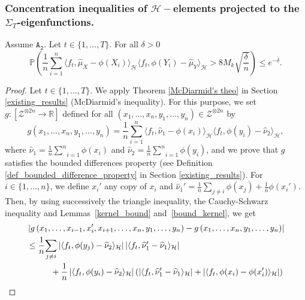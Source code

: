 \documentclass[twoside,11pt]{article}
\newcommand{\Hk}{\mathcal{H}}
\newcommand{\nb}{n}
\newcommand{\R}{\mathbb{R}}%
\newcommand{\PP}{\mathbb{P}}%
\newcommand{\A}[1]{$\mathtt{A_#1}$}
\begin{document}
\subsubsection*{Concentration inequalities of $\Hk-$elements projected to the $\Sigma_T$-eigenfunctions.}
\begin{lemma}
\label{covariance_term}
Assume \A{2}. Let $t \in \{1,\ldots,T\}$. For all $\delta >0$ 
\begin{equation*}
    \PP \left(  \frac{1}{\nb} \underset{i=1}{\overset{\nb}{\sum}} \langle f_t, \widehat{\mu}_X - \phi(X_i) \rangle_{\Hk} \langle f_t,\phi(Y_i) - \widehat{\mu}_Y  \rangle_{\Hk}> 8 M_k \sqrt{\frac \delta \nb} \right) \leq e^{- \delta}.
\end{equation*}
\end{lemma}
\begin{proof}
Let $t \in \{1,\ldots,T\}$. We apply Theorem \ref{McDiarmid's theo} in Section \ref{existing_results} (McDiarmid's inequality). For this purpose, we set $g : [\mathcal{Z}^{\otimes 2\nb} \longrightarrow \R]$ defined for all $ \left(x_1,\ldots,x_{\nb},y_1,\ldots,y_{\nb}\right) \in \mathcal{Z}^{\otimes 2\nb}$ by
$$g\left(x_1,\ldots,x_{\nb},y_1,\ldots,y_{\nb}\right) =  \frac{1}{\nb} \underset{i=1}{\overset{\nb}{\sum}} \langle f_t, \widehat{\nu}_1 - \phi(x_i) \rangle_{\Hk} \langle f_t,\phi(y_i) - \widehat{\nu}_2  \rangle_{\Hk},$$
where $\widehat{\nu}_1 = \frac{1}{\nb} \underset{i=1}{\overset{\nb}{\sum}} \phi(x_i)$ and $\widehat{\nu}_2 = \frac{1}{\nb} \underset{i=1}{\overset{\nb}{\sum}} \phi(y_i)$, and we prove that $g$ satisfies the bounded differences property (see Definition \ref{def_bounded_difference_property} in Section \ref{existing_results}). For $i \in \{1,\ldots,\nb\}$, we define $x_i'$ any copy of $x_i$ and $\widehat{\nu}_1' = \frac{1}{\nb}  \underset{j \neq i}      {\sum} \phi(x_j) + \frac{1}{\nb} \phi(x_i')$. Then, by using successively the triangle inequality, the Cauchy-Schwarz inequality and Lemmas~\ref{kernel_bound} and~\ref{bound_kernel}, we get 
\begin{align*}
     & \left | g\left(x_1,\ldots,x_{i-1},x_i',x_{i+1},\ldots,x_{\nb},y_1,\ldots,y_{\nb}\right) - g\left(x_1,\ldots,x_{\nb},y_1,\ldots,y_{\nb}\right) \right | \\
     &  \leq \frac{1}{\nb}  \underset{j \neq i}{\sum}  \left | \langle f_t,\phi(y_j) - \widehat{\nu}_2  \rangle_{\Hk} \right | \left | \langle f_t, \widehat{\nu}_1' - \widehat{\nu}_1 \rangle_{\Hk}\right | \\
     & \hspace{1 cm} + \frac{1}{\nb} \left | \langle f_t,\phi(y_i) - \widehat{\nu}_2  \rangle_{\Hk} \right | \left( \left | \langle f_t, \widehat{\nu}_1' - \widehat{\nu}_1\rangle_{\Hk} \right | + \left | \langle f_t, \phi(x_i) -  \phi(x_i') \rangle_{\Hk} \right | \right) \\

\end{align*}
\end{proof}
\end{document}
